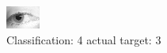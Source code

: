 \begin{figure}[h!]
\begin{center}
\includegraphics[width=0.60\columnwidth]{figures/ID1352_class_4_target_3.png}
\end{center}
\caption{ Classification: 4 actual target: 3}
\label{fig:ID1352_class_4_target_3}
\end{figure}
